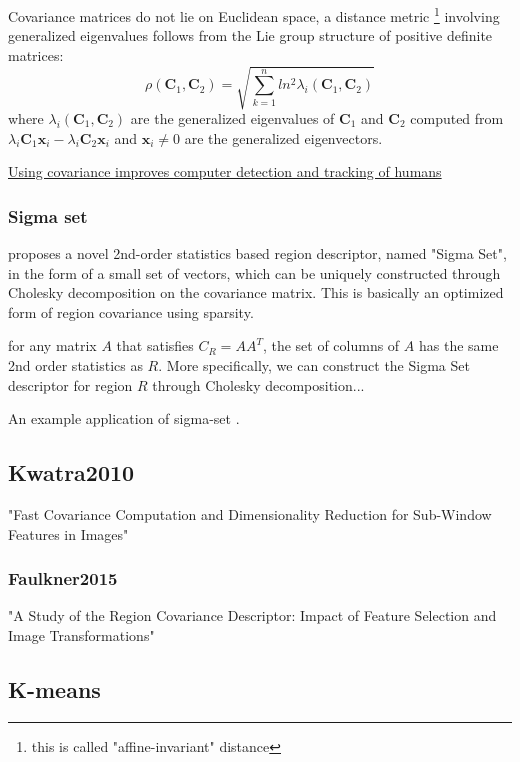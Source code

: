 Covariance matrices do not lie on Euclidean space, a distance metric
\cite{Forstner1999}\footnote{this is called "affine-invariant" distance}
 involving generalized eigenvalues follows from the Lie group structure of positive definite matrices:
\begin{equation}
 \rho(\mathbf{C}_1, \mathbf{C}_2) = \sqrt{\sum\limits^n_{k=1} ln^2 \lambda_i(\mathbf{C}_1, \mathbf{C}_2)}
\end{equation}
where $\lambda_i(\mathbf{C}_1, \mathbf{C}_2)$ are the generalized eigenvalues
of $\mathbf{C}_1$ and $\mathbf{C}_2$ computed from 
$\lambda_i\mathbf{C}_1\mathbf{x}_i - \lambda_i\mathbf{C}_2\mathbf{x}_i$
and $\mathbf{x}_i \ne 0$ are the generalized eigenvectors.

\href{https://spie.org/news/0368-using-covariance-improves-computer-detection-and-tracking-of-humans?SSO=1}{Using covariance improves computer detection and tracking of humans}


\subsubsection{Sigma set}\label{sigmaset}
\cite{Chang2009} proposes a novel 2nd-order statistics based region descriptor, named "Sigma Set", in the form of a small set of vectors, which can be uniquely constructed through Cholesky decomposition on the covariance matrix.
This is basically an optimized form of region covariance using sparsity.

for any matrix $A$ that satisfies $C_R=AA^T$, the set of columns of $A$ has the same 2nd order statistics as $R$. More specifically, we can construct the Sigma Set descriptor for region $R$ through Cholesky decomposition...

An example application of sigma-set \cite{Uzair2013}.

\subsection{Kwatra2010}
"Fast Covariance Computation and
Dimensionality Reduction for Sub-Window Features in Images"

\subsubsection{Faulkner2015}
\cite{Faulkner2015} "A Study of the Region Covariance Descriptor: Impact of Feature Selection and Image Transformations"

\subsection{K-means}

